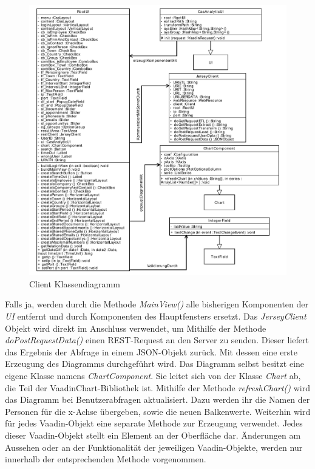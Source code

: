 \begin{figure}[H]
\begin{center}
\includegraphics[width=1.0\textwidth]{pics/ClientKlassendiagramm.pdf}
\caption{Client Klassendiagramm}
\label{umsetzung_klassendiagramm_client}
\end{center}
\end{figure}

Falls ja, werden durch die Methode \textit{MainView()} alle bisherigen Komponenten der \textit{UI} entfernt und durch Komponenten des Hauptfensters ersetzt. Das \textit{JerseyClient} Objekt wird direkt im Anschluss verwendet, um Mithilfe der Methode \textit{doPostRequestData()} einen REST-Request an den Server zu senden. Dieser liefert das Ergebnis der Abfrage in einem JSON-Objekt zurück. Mit dessen eine erste Erzeugung des Diagramms durchgeführt wird. Das Diagramm selbst besitzt eine eigene Klasse namens \textit{ChartComponent}. Sie leitet sich von der Klasse \textit{Chart} ab, die Teil der VaadinChart-Bibliothek ist. Mithilfe der Methode \textit{refreshChart()} wird das Diagramm bei Benutzerabfragen aktualisiert. Dazu werden ihr die Namen der Personen für die x-Achse übergeben, sowie die neuen Balkenwerte. Weiterhin wird für jedes Vaadin-Objekt eine separate Methode zur Erzeugung verwendet. Jedes dieser Vaadin-Objekt stellt ein Element an der Oberfläche dar. Änderungen am Aussehen oder an der Funktionalität der jeweiligen Vaadin-Objekte, werden nur innerhalb der entsprechenden Methode vorgenommen.

